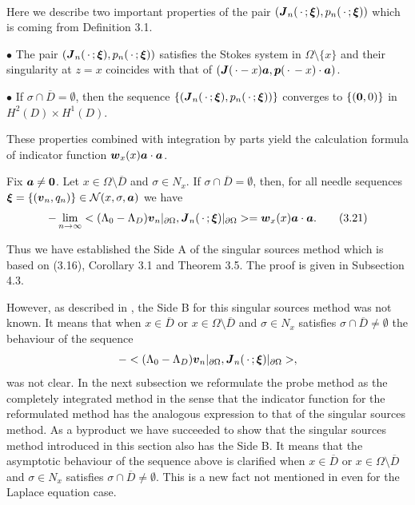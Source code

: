  
 $\quad$
 
 
 Here we describe two important properties of the pair  $(\mbox{\boldmath $J$}_n(\,\cdot\,;\mbox{\boldmath $\xi$}), p_n(\,\cdot\,;\mbox{\boldmath $\xi$}))$
 which is coming from Definition 3.1.
 
 $\bullet$  The pair $(\mbox{\boldmath $J$}_n(\,\cdot\,;\mbox{\boldmath $\xi$}), p_n(\,\cdot\,;\mbox{\boldmath $\xi$}))$ satisfies the Stokes system in $\Omega\setminus\{x\}$ and their singularity at $z=x$ coincides with
 that of $(\mbox{\boldmath $J$}(\,\cdot-x)\mbox{\boldmath $a$}, \mbox{\boldmath $p$}(\,\cdot\,-x)\cdot\mbox{\boldmath $a$})$.
 
 $\bullet$  If $\sigma\cap\overline{D}=\emptyset$, then the sequence
 $\{(\mbox{\boldmath $J$}_n(\,\cdot\,;\mbox{\boldmath $\xi$}), p_n(\,\cdot\,;\mbox{\boldmath $\xi$}))\}$ 
 converges to $\{(\mbox{\boldmath $0$},0)\}$ in $H^2(D)\times H^1(D)$.


 These properties combined with integration by parts yield the calculation formula
 of indicator function $\mbox{\boldmath $w$}_x(x)\mbox{\boldmath $a$}\cdot\mbox{\boldmath $a$}$.
 

Fix $\mbox{\boldmath $a$}\not=\mbox{\boldmath $0$}$.
Let $x\in\Omega\setminus\overline{D}$ and $\sigma\in N_x$.
If $\sigma\cap\overline{D}=\emptyset$, then, for all needle sequences 
$\mbox{\boldmath $\xi$}=\{(\mbox{\boldmath $v$}_n, q_n)\}\in{\cal N}(x,\sigma,\mbox{\boldmath $a$})$ we have
$$\displaystyle
-\lim_{n\rightarrow\infty}<(\Lambda_0-\Lambda_D)\mbox{\boldmath $v$}_n\vert_{\partial\Omega},
\mbox{\boldmath $J$}_n(\,\cdot\,;\mbox{\boldmath $\xi$})\vert_{\partial\Omega}>
=\mbox{\boldmath $w$}_x(x)\mbox{\boldmath $a$}\cdot\mbox{\boldmath $a$}.
\tag {3.21}
$$




\endproclaim

Thus we have established the Side A of the singular sources method which is based on (3.16), Corollary 3.1 and Theorem 3.5.  The proof is given in Subsection 4.3.  


However, as described in \cite{IPS}, the Side B for this singular sources method was not known.    It means that
 when $x\in\overline{D}$ or $x\in\Omega\setminus\overline{D}$ and $\sigma\in N_x$ satisfies $\sigma\cap\overline{D}\not=\emptyset$ the behaviour of the sequence
 $$\displaystyle
 -<(\Lambda_0-\Lambda_D)\mbox{\boldmath $v$}_n\vert_{\partial\Omega},
\mbox{\boldmath $J$}_n(\,\cdot\,;\mbox{\boldmath $\xi$})\vert_{\partial\Omega}>,
$$
 was not clear.  In the next subsection we reformulate the probe method
 as the completely integrated method in the sense that the indicator function for  the reformulated method
 has the analogous expression to that of the singular sources method.
 As a byproduct we have succeeded to show that the singular sources method
 introduced in this section also has the Side B.  It means that the asymptotic behaviour
 of the  sequence above is clarified when $x\in\overline{D}$ or $x\in\Omega\setminus\overline{D}$ and
 $\sigma\in N_x$ satisfies $\sigma\cap\overline{D}\not=\emptyset$.  This is a new fact
 not mentioned in \cite{IPS} even for the Laplace equation case.

